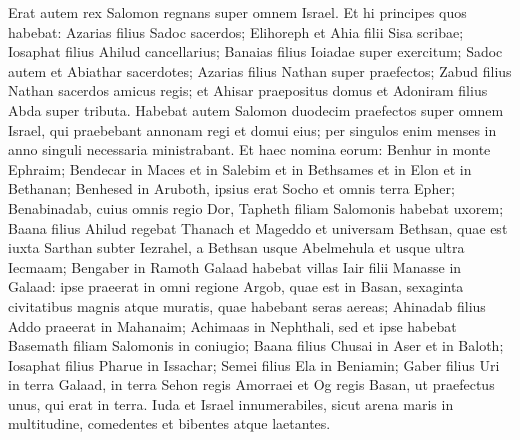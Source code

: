 \begin{biblechapter}  
\verse Erat autem rex Salomon regnans super omnem Israel. 
\verse Et hi principes quos habebat: Azarias filius Sadoc sacerdos; 
\verse Elihoreph et Ahia filii Sisa scribae; Iosaphat filius Ahilud cancellarius; 
\verse Banaias filius Ioiadae super exercitum; Sadoc autem et Abiathar sacerdotes; 
\verse Azarias filius Nathan super praefectos; Zabud filius Nathan sacerdos amicus regis; 
\verse et Ahisar praepositus domus et Adoniram filius Abda super tributa. 
\verse Habebat autem Salomon duodecim praefectos super omnem Israel, qui praebebant annonam regi et domui eius; per singulos enim menses in anno singuli necessaria ministrabant. 
\verse Et haec nomina eorum: Benhur in monte Ephraim; 
\verse Bendecar in Maces et in Salebim et in Bethsames et in Elon et in Bethanan;  
\verse Benhesed in Aruboth, ipsius erat Socho et omnis terra Epher; 
\verse Benabinadab, cuius omnis regio Dor, Tapheth filiam Salomonis habebat uxorem;  
\verse Baana filius Ahilud regebat Thanach et Mageddo et universam Bethsan, quae est iuxta Sarthan subter Iezrahel, a Bethsan usque Abelmehula et usque ultra Iecmaam; 
\verse Bengaber in Ramoth Galaad habebat villas Iair filii Manasse in Galaad: ipse praeerat in omni regione Argob, quae est in Basan, sexaginta civitatibus magnis atque muratis, quae habebant seras aereas; 
\verse Ahinadab filius Addo praeerat in Mahanaim; 
\verse Achimaas in Nephthali, sed et ipse habebat Basemath filiam Salomonis in coniugio; 
\verse Baana filius Chusai in Aser et in Baloth; 
\verse Iosaphat filius Pharue in Issachar; 
\verse Semei filius Ela in Beniamin; 
\verse Gaber filius Uri in terra Galaad, in terra Sehon regis Amorraei et Og regis Basan, ut praefectus unus, qui erat in terra. 
\verse Iuda et Israel innumerabiles, sicut arena maris in multitudine, comedentes et bibentes atque laetantes. 
\end{biblechapter}

